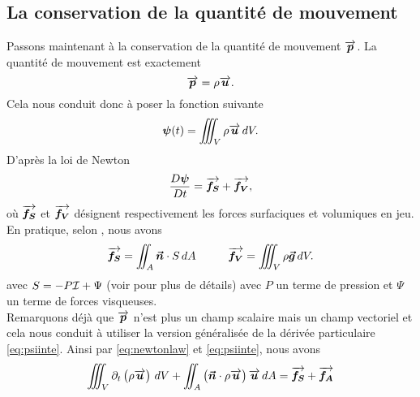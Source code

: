 \subsection{La conservation de la quantité de mouvement}
\noindent Passons maintenant à la conservation de la quantité de mouvement $\overrightarrow{\boldsymbol{p}}$. La quantité de mouvement est exactement
\begin{equation}
	\overrightarrow{\boldsymbol{p}} = \rho \overrightarrow{\boldsymbol{u}}. \label{eq:qtmouv}
\end{equation}
Cela nous conduit donc à poser la fonction suivante
\[ \boldsymbol{\psi} (t) = \iiint_V \rho\overrightarrow{\boldsymbol{u}}\,d V.\]
D'après la loi de Newton 
\begin{equation}
	\frac{D \boldsymbol{\psi}}{D t} = \overrightarrow{\boldsymbol{f_S}} + \overrightarrow{\boldsymbol{f_V}}, \label{eq:newtonlaw}
\end{equation}
où $\overrightarrow{\boldsymbol{f_S}}$ et $\overrightarrow{\boldsymbol{f_V}}$ désignent respectivement les forces surfaciques et volumiques en jeu.\\
En pratique, selon \citet{toro_riemann_2009}, nous avons
\begin{equation}
	\overrightarrow{\boldsymbol{f_S}} = \iint_A \boldsymbol{\vec{n}} \cdot S\,d A \hspace{1cm} \overrightarrow{\boldsymbol{f_V}} = \iiint_V \rho \boldsymbol{\vec{g}} \, dV. \label{eq:forces}
\end{equation}
avec $S = -P\mathcal{I} + \Psi$ (voir \citet{toro_riemann_2009} pour plus de détails) avec $P$ un terme de pression et $\Psi$ un terme de forces visqueuses.\\
Remarquons déjà que $\overrightarrow{\boldsymbol{p}}$ n'est plus un champ scalaire mais un champ vectoriel et cela nous conduit à utiliser la version généralisée de la dérivée particulaire \eqref{eq:psiinte}. Ainsi par \eqref{eq:newtonlaw} et \eqref{eq:psiinte}, nous avons
\begin{equation}
	\iiint_V \partial_t \left(\rho\overrightarrow{\boldsymbol{u}}\right)\, d V + \iint_A \left(\boldsymbol{\vec{n}}\cdot\rho\overrightarrow{\boldsymbol{u}}\right)\overrightarrow{\boldsymbol{u}}\,d A = \overrightarrow{\boldsymbol{f_S}} + \overrightarrow{\boldsymbol{f_A}}
\end{equation}
